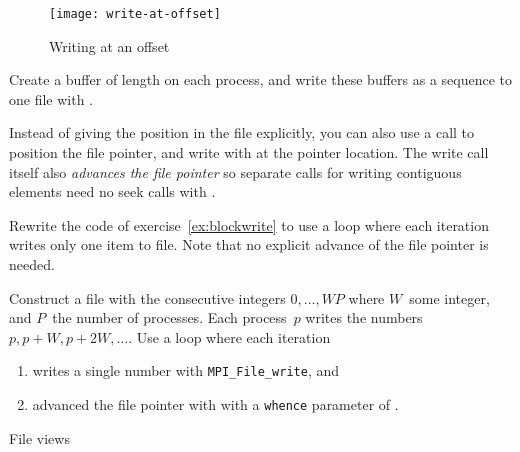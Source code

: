 \begin{figure}[ht]
  \label{fig:write-at}
  \caption{Writing at an offset}
  \texttt{[image: write-at-offset]}
\end{figure}

\begin{exercise}
  \label{ex:blockwrite}
  Create a buffer of length  on each process, and write
  these buffers as a sequence to one file with .
\end{exercise}

Instead of giving the position in the file explicitly, you can also
use a  call to position the file pointer,
and write with  at the pointer location.
The write call itself also 
\emph{advances the file pointer}
so separate calls for writing contiguous elements 
need no seek calls with .

\begin{exercise}
  \label{ex:blockadvance}
  Rewrite the code of exercise~\ref{ex:blockwrite} to
  use a loop where each iteration
  writes only one item to file.
  Note that no explicit advance of the file pointer is needed.
\end{exercise}

\begin{exercise}
  \label{ex:blockseek}
  Construct a file with the consecutive integers $0,\ldots,WP$ where
  $W$~some integer, and $P$~the number of processes. Each process~$p$
  writes the numbers $p,p+W,p+2W,\ldots$. Use a loop where each iteration
  \begin{enumerate}
  \item writes a single number with \lstinline{MPI_File_write}, and
  \item advanced the file pointer with 
    with a \lstinline{whence} parameter of
    .
  \end{enumerate}
\end{exercise}

 {File views}

